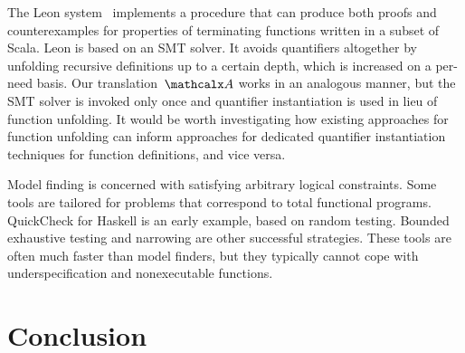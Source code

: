 The Leon system~\cite{blanc2013overview} implements a procedure that can
produce both proofs and counter\-examples for properties of terminating functions
written in a subset of Scala. Leon is based on an SMT solver. It avoids
quantifiers altogether by unfolding recursive definitions up to a certain
depth, which is increased on a per-need basis.
Our translation~$\conv$ works in an analogous manner,
but the SMT solver is invoked only once
and quantifier instantiation is used in lieu of function unfolding.
It would be
worth investigating how existing approaches for function
unfolding can inform approaches for dedicated quantifier instantiation
techniques for function definitions, and vice versa.

Model finding is concerned with satisfying arbitrary logical constraints. Some
tools are tailored for problems that correspond to total functional
programs. QuickCheck \cite{claessen-hughes-2000} for Haskell is an
early example, based on random testing. Bounded exhaustive testing
\cite{runciman-et-al-2008} and narrowing
\cite{lindblad-2008-testing} are other successful strategies. These
tools are often much faster than model finders, but they typically cannot cope
with underspecification and nonexecutable functions.




%
%
%

\section{Conclusion}
\label{sec:conclusion}

